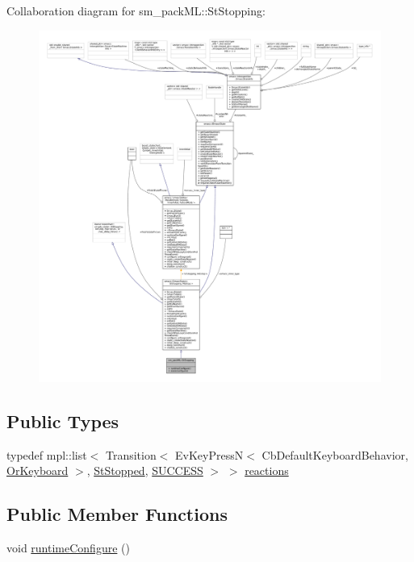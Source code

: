 Collaboration diagram for sm\+\_\+pack\+ML\+:\+:St\+Stopping\+:
\nopagebreak
\begin{figure}[H]
\begin{center}
\leavevmode
\includegraphics[width=350pt]{structsm__packML_1_1StStopping__coll__graph}
\end{center}
\end{figure}
\subsection*{Public Types}
\begin{DoxyCompactItemize}
\item 
typedef mpl\+::list$<$ Transition$<$ Ev\+Key\+PressN$<$ Cb\+Default\+Keyboard\+Behavior, \hyperlink{classsm__packML_1_1OrKeyboard}{Or\+Keyboard} $>$, \hyperlink{structsm__packML_1_1StStopped}{St\+Stopped}, \hyperlink{classSUCCESS}{S\+U\+C\+C\+E\+SS} $>$ $>$ \hyperlink{structsm__packML_1_1StStopping_af103eed37e68bd7a728c921ec58a2942}{reactions}
\end{DoxyCompactItemize}
\subsection*{Public Member Functions}
\begin{DoxyCompactItemize}
\item 
void \hyperlink{structsm__packML_1_1StStopping_a806226c89b297d619906049ff04df11f}{runtime\+Configure} ()
\end{DoxyCompactItemize}
